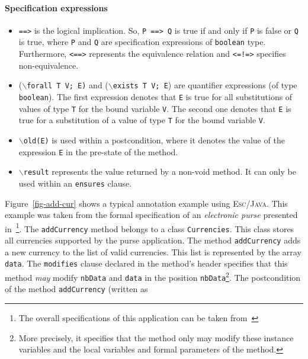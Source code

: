 \documentclass[a4paper]{llncs}
\newcommand{\escj}{\textsc{Esc/Java}}
\begin{document}
\paragraph{\bf Specification expressions} 
\begin{itemize} 
\item{\texttt{==>}} is the logical implication. So, \texttt{P 
==> Q} is true if and only if \texttt{P} is false or \texttt{Q} is 
true, where \texttt{P} and \texttt{Q} are specification expressions of  
\texttt{boolean} type. Furthermore, \texttt{<==>} represents the 
equivalence relation and \texttt{<=!=>} specifies non-equivalence. 
 
\item {($\backslash$\texttt{forall T V; E)} and 
($\backslash$\texttt{exists T V; E})} are quantifier expressions (of 
type \texttt{boolean}).  The first expression denotes that \texttt{E}
is true
for all substitutions of values of type \texttt{T} for the bound 
variable \texttt{V}. The second one denotes that \texttt{E} is true 
for a substitution of a value of type \texttt{T} for the bound 
variable \texttt{V}. 
 
\item{\texttt{$\backslash$old(E)}} is used within a postcondition,
where it denotes the value of the expression \texttt{E} in the
pre-state of the method.
 
\item {\tt$\backslash$result} represents the value returned by 
a non-void method. It can only be used within an
\texttt{ensures} clause.
\end{itemize}
Figure~\ref{fig-add-cur} shows a typical annotation example using 
\escj. This example was taken from the formal specification of an
\emph{electronic purse} presented in~\cite{CH02}\footnote{The overall
specifications of this application can be taken
from~\cite{CH01Url}}. The \texttt{addCurrency} method belongs
to a class \texttt{Currencies}. This class stores all currencies 
supported by the purse application. The method 
\texttt{addCurrency} adds a new currency to the list of valid 
currencies. This list is represented by the 
array \texttt{data}. The \texttt{modifies} clause declared in the 
method's header specifies that 
this method \emph{may} modify \texttt{nbData} and 
\texttt{data} in the position \texttt{nbData}\footnote{More precisely,
it specifies that the method only may modify these instance variables
and the local variables and formal parameters of the method.}. The
postcondition of the method \texttt{addCurrency} (written as 
\end{document}
